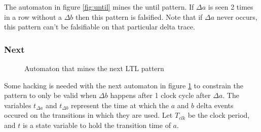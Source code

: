 \documentclass[acmlarge,11pt]{acmart}
\begin{document}
The automaton in figure \ref{fig:until} mines the until pattern. If $\Delta a$ is seen 2 times in a row without a $\Delta b$ then this pattern is falsified. Note that if $\Delta a$ never occurs, this pattern can't be falsifiable on that particular delta trace.

\subsubsection{Next}
\begin{figure}
  \centering
\caption{Automaton that mines the next LTL pattern}
\label{fig:next}
\end{figure}

Some hacking is needed with the next automaton in figure \ref{fig:next} to constrain the pattern to only be valid when $\Delta b$ happens after 1 clock cycle after $\Delta a$.
The variables $t_{\Delta a}$ and $t_{\Delta b}$ represent the time at which the $a$ and $b$ delta events occured on the transitions in which they are used.
Let $T_{clk}$ be the clock period, and $t$ is a state variable to hold the transition time of $a$.
\end{document}
